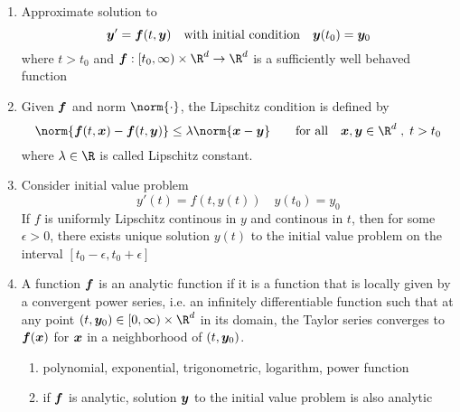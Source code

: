 \documentclass[11pt]{article}
\begin{document}
\tableofcontents

\newpage

\section{}

\subsection{}


\begin{enumerate}
    \item {} Approximate solution to 
    \[
        \by' = \bf ( t, \by)
        \quad \text{with initial condition} \quad 
        \by ( t_0 ) = \by_0    
    \]
    where $t > t_0$ and $\bf: [t_0, \infty) \times \R^d \to \R^d$ is a sufficiently well behaved function
    \item {} Given $\bf$ and norm $\norm{\cdot}$, the Lipschitz condition is defined by 
    \[
        \norm{
            \bf(t, \bx) - \bf(t, \by)
        } \leq \lambda \norm{\bx - \by}
        \quad \quad
        \text{for all}
        \quad \bx, \by \in \R^d \;,\; t> t_0
    \]
    where $\lambda \in \R$ is called Lipschitz constant. 
    \item {} Consider initial value problem 
    \[
        y'(t) = f(t, y(t))
        \quad
        y(t_0) = y_0
    \]
    If $f$ is uniformly Lipschitz continous in $y$ and continous in $t$, then for some $\epsilon > 0$, there exists unique solution $y(t)$ to the initial value problem on the interval $[t_0 - \epsilon, t_0 + \epsilon]$ 
    \item {} A function $\bf$ is an analytic function if it is a function that is locally given by a convergent power series, i.e. an infinitely differentiable function such that at any point $(t,\by_0) \in [0, \infty)\times \R^d$ in its domain, the Taylor series converges to $\bf(\bx)$ for $\bx$ in a neighborhood of $(t,\by_0)$.
    \begin{enumerate}
        \item {} polynomial, exponential, trigonometric, logarithm, power function
        \item {} if $\bf$ is analytic, solution $\by$ to the initial value problem is also analytic

\end{enumerate}
\end{enumerate}
\end{document}

